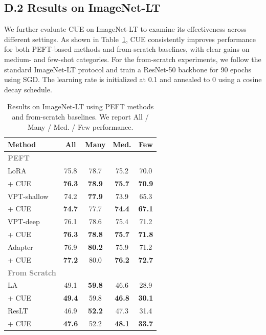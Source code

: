 \subsection*{D.2 Results on ImageNet-LT}
We further evaluate CUE on ImageNet-LT to examine its effectiveness across 
different settings. As shown in Table~\ref{tab:imagenet_peft_scratch}, 
CUE consistently improves performance for both PEFT-based methods and 
from-scratch baselines, with clear gains on medium- and few-shot categories.
For the from-scratch experiments, we follow the standard ImageNet-LT protocol 
and train a ResNet-50 backbone for 90 epochs using SGD. The learning rate is 
initialized at 0.1 and annealed to 0 using a cosine decay schedule.
\begin{table}[h]
\centering
\caption{Results on ImageNet-LT using PEFT methods and from-scratch baselines. 
We report All / Many / Med. / Few performance.}
\label{tab:imagenet_peft_scratch}
\small
\begin{tabular}{l|cccc}
\toprule
\textbf{Method} & \textbf{All} & \textbf{Many} & \textbf{Med.} & \textbf{Few} \\
\midrule
\textcolor{gray}{\textbf{PEFT}} & & & & \\
\quad 
LoRA~\cite{hu2022lora}  & 75.8 & 78.7	& 75.2 &	70.0 \\
\quad + CUE	&\textbf{76.3} & \textbf{78.9} & \textbf{75.7} & \textbf{70.9}\\
\quad VPT-shallow~\cite{jia2022visual} &  74.2  & \textbf{77.9} & 73.9 & 65.3 
\\
\quad + CUE & \textbf{74.7} & 77.7 & \textbf{74.4} & \textbf{67.1}  \\
\quad VPT-deep~\cite{jia2022visual} & 76.1 & 78.6  & 75.4  & 71.2  \\
\quad + CUE & \textbf{76.3} & \textbf{78.8} & \textbf{75.7} & \textbf{71.8} \\
\quad Adapter~\cite{houlsby2019parameter} & 76.9 & \textbf{80.2} & 75.9 & 71.2 \\
\quad + CUE & \textbf{77.2} &  80.0 & \textbf{76.2} & \textbf{72.7} \\[3pt]
\midrule
\textcolor{gray}{\textbf{From Scratch}} & & & & \\
\quad LA~\cite{menon2021longtail} & 49.1 & \textbf{59.8}  & 46.6 & 28.9 \\
\quad + CUE &  \textbf{49.4} & 59.8 & \textbf{46.8} & \textbf{30.1} \\
\quad ResLT~\cite{cui2022reslt} & 46.9 & \textbf{52.2}& 47.3 & 31.4\\
\quad + CUE & \textbf{47.6} & 52.2  & \textbf{48.1} & \textbf{33.7} \\
\bottomrule
\end{tabular}
\vspace{-1em}
\end{table}


